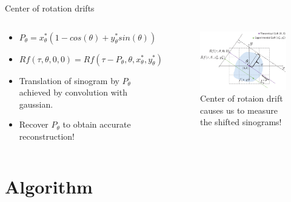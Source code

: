 \documentclass{beamer}
\begin{document}
\begin{frame}{Center of rotation drifts}
	\begin{columns}[onlytextwidth,T]
		\column{\dimexpr\linewidth-45mm}
		\begin{block}{}
			\begin{itemize}
				\item $P_{\theta} = x_{\theta}^{*}(1-cos(\theta) + y_{\theta}^{*}sin(\theta))$ 
				\item $Rf(\tau,\theta,0,0) = Rf(\tau - P_{\theta},\theta,x_{\theta}^{*},y_{\theta}^{*})$
				\item Translation of sinogram by $P_{\theta}$ achieved by convolution with gaussian.
				\item Recover $P_{\theta}$ to obtain accurate reconstruction!
			\end{itemize}					
		\end{block}
		\column{40mm}
		\begin{figure}
			\includegraphics[width=45mm]{figures/drifts.png}
			\caption{Center of rotaion drift causes us to measure the shifted sinograms!}
		\end{figure}
	\end{columns}
\end{frame}

\section{Algorithm}
\end{document}
